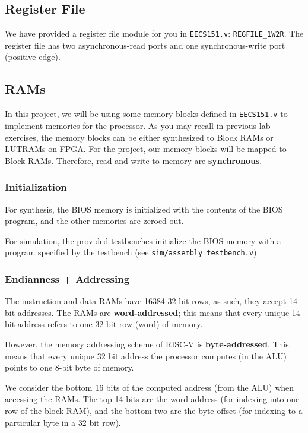 \documentclass[11pt]{article}
\begin{document}
\subsection{Register File}
\label{reg_file}
We have provided a register file module for you in \verb|EECS151.v|: \verb|REGFILE_1W2R|. The register file has two asynchronous-read ports and one synchronous-write port (positive edge).

\subsection{RAMs}
\label{ram_info}
In this project, we will be using some memory blocks defined in \verb|EECS151.v| to implement memories for the processor.
As you may recall in previous lab exercises, the memory blocks can be either synthesized to Block RAMs or LUTRAMs on FPGA.
For the project, our memory blocks will be mapped to Block RAMs. Therefore, read and write to memory are \textbf{synchronous}.

\subsubsection{Initialization}

For synthesis, the BIOS memory is initialized with the contents of the BIOS program, and the other memories are zeroed out.

For simulation, the provided testbenches initialize the BIOS memory with a program specified by the testbench (see \verb|sim/assembly_testbench.v|).

\subsubsection{Endianness + Addressing}
The instruction and data RAMs have 16384 32-bit rows, as such, they accept 14 bit addresses.
The RAMs are \textbf{word-addressed}; this means that every unique 14 bit address refers to one 32-bit row (word) of memory.

However, the memory addressing scheme of RISC-V is \textbf{byte-addressed}.
This means that every unique 32 bit address the processor computes (in the ALU) points to one 8-bit byte of memory.

We consider the bottom 16 bits of the computed address (from the ALU) when accessing the RAMs.
The top 14 bits are the word address (for indexing into one row of the block RAM), and the bottom two are the byte offset (for indexing to a particular byte in a 32 bit row).
\end{document}
